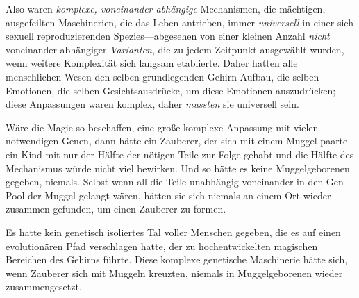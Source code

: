 Also waren \emph{komplexe, voneinander abhängige} Mechanismen, die mächtigen, ausgefeilten Maschinerien, die das Leben antrieben, immer \emph{universell} in einer sich sexuell reproduzierenden Spezies—abgesehen von einer kleinen Anzahl \emph{nicht} voneinander abhängiger \emph{Varianten}, die zu jedem Zeitpunkt ausgewählt wurden, wenn weitere Komplexität sich langsam etablierte. Daher hatten alle menschlichen Wesen den selben grundlegenden Gehirn-Aufbau, die selben Emotionen, die selben Gesichtsausdrücke, um diese Emotionen auszudrücken; diese Anpassungen waren komplex, daher \emph{mussten} sie universell sein.

Wäre die Magie so beschaffen, eine große komplexe Anpassung mit vielen notwendigen Genen, dann hätte ein Zauberer, der sich mit einem Muggel paarte ein Kind mit nur der Hälfte der nötigen Teile zur Folge gehabt und die Hälfte des Mechanismus würde nicht viel bewirken. Und so hätte es keine Muggelgeborenen gegeben, niemals. Selbst wenn all die Teile unabhängig voneinander in den Gen-Pool der Muggel gelangt wären, hätten sie sich niemals an einem Ort wieder zusammen gefunden, um einen Zauberer zu formen.

Es hatte kein genetisch isoliertes Tal voller Menschen gegeben, die es auf einen evolutionären Pfad verschlagen hatte, der zu hochentwickelten magischen Bereichen des Gehirns führte. Diese komplexe genetische Maschinerie hätte sich, wenn Zauberer sich mit Muggeln kreuzten, niemals in Muggelgeborenen wieder zusammengesetzt.

